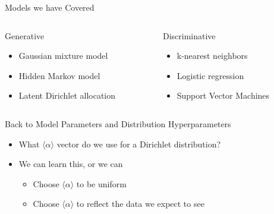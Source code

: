 \documentclass[aspectratio=169]{beamer}
\begin{document}
\begin{frame}{Models we have Covered}

\begin{columns}
\begin{column}{0.5\textwidth}
Generative
\begin{itemize}
	\item Gaussian mixture model
	\item Hidden Markov model
	\item Latent Dirichlet allocation
\end{itemize}
\end{column}
\begin{column}{0.5\textwidth}
Discriminative
\begin{itemize}
	\item k-nearest neighbors
	\item Logistic regression
	\item Support Vector Machines
\end{itemize}
\end{column}
\end{columns}
\end{frame}

\begin{frame}{Back to Model Parameters and Distribution Hyperparameters}

\begin{itemize}
	\item What $\langle \alpha \rangle$ vector do we use for a Dirichlet distribution?
	\item We can learn this, or we can
	\begin{itemize}
		\item Choose $\langle \alpha \rangle$ to be uniform
		\item Choose $\langle \alpha \rangle$ to reflect the data we expect to see
	\end{itemize}

\end{itemize}
\end{frame}
\end{document}
